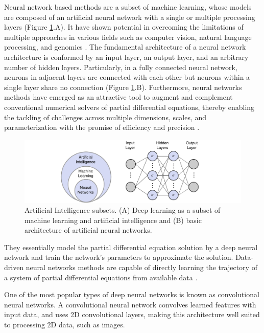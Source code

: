 \documentclass[11pt,twoside]{article}
\begin{document}
Neural network based methods are a subset of machine learning, whose models are composed of an artificial neural network with a single 
or multiple processing layers (Figure \ref{deep_learning_subset_architecture}.A). It have shown potential in overcoming the limitations 
of multiple approaches in various fields such as computer vision, natural language processing, and genomics 
\citep{lecun_deep_2015,goodfellow_deep_2016}. The fundamental architecture of a neural network architecture is conformed by an input 
layer, an output layer, and an arbitrary number of hidden layers. Particularly, in a fully connected neural network, neurons in adjacent 
layers are connected with each other but neurons within a single layer share no connection (Figure \ref{deep_learning_subset_architecture}.B). 
Furthermore, neural networks methods have emerged as an attractive tool to augment and complement conventional numerical solvers of partial 
differential equations, thereby enabling the tackling of challenges across multiple dimensions, scales, and parameterization with the promise 
of efficiency and precision \citep{blechschmidt_three_2021}. 

\begin{figure}[H]
\centering
    \includegraphics[width=1.0\textwidth]{figs/Artificial_Intelligence_subsets.pdf}
    \caption{Artificial Intelligence subsets. (A) Deep learning as a subset of machine learning and artificial intelligence and (B) basic 
    architecture of artificial neural networks.}    
    \label{deep_learning_subset_architecture}
\end{figure}

They essentially model the partial differential equation solution by a deep neural network and train the network’s parameters to approximate 
the solution. Data-driven neural networks methods are capable of directly learning the trajectory of a system of partial differential 
equations from available data \citep{li_neural_2020,li_fourier_2021}.

One of the most popular types of deep neural networks is known as convolutional neural networks. A convolutional neural network convolves 
learned features with input data, and uses 2D convolutional layers, making this architecture well suited to processing 2D data, such as images.
\end{document}
